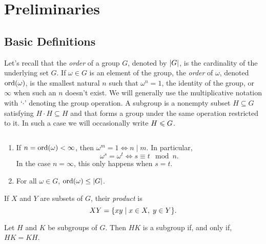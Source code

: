 \chapter{Preliminaries}
\section{Basic Definitions}
\setcounter{subsection}{1}

Let's recall that the \textsl{order} of a group $G$, denoted by $\left\vert{G}\right\vert$, is the cardinality of the underlying set $G$. If $\omega\in G$ is an element of the group, the \textsl{order} of\/ $\omega$, denoted ${\rm ord}(\omega)$, is the smallest natural $n$ such that $\omega^n=1$, the identity of the group, or~$\infty$ when such an $n$ doesn't exist. We will generally use the multiplicative notation with `$\cdot$' denoting the group operation. A subgroup is a nonempty subset $H\subseteq G$ satisfying $H\cdot H\subseteq H$ and that forms a group under the same operation restricted to it. In such a case we will occasionally write $H\leqslant G$.

\begin{rems}${}$
    \begin{enumerate}[\rm i)]
        \item If $n={\rm ord}(\omega) < \infty$, then\/ $\omega^m=1\iff n\mid m$. In particular, 
        $$
            \omega^s=\omega^t\iff s\equiv t\mod n.
        $$
        In the case $n=\infty$, this only happens when $s=t$.
    
        \item For all $\omega\in G$, ${\rm ord}(\omega)\le \left\vert{G}\right\vert$.
    \end{enumerate}
\end{rems}

\medskip

If $X$ and $Y$ are subsets of $G$, their \textsl{product} is
$$
    XY =\{xy\mid x\in X,\; y\in Y\}.
$$

\begin{lem}\label{group-commutativity}
    Let $H$ and $K$ be subgroups of $G$. Then $HK$ is a subgroup if, and only if, $HK=KH$.
\end{lem}

